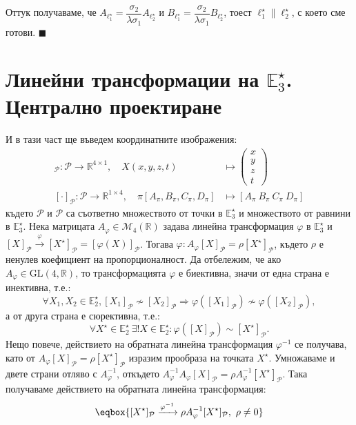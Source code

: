 \documentclass[12pt]{article}
\begin{document}
Оттук получаваме, че $A_{\ell_1^\star}=\dfrac{\sigma_2}{\lambda \sigma_1}A_{\ell_2^\star}$ и $B_{\ell_1^\star}=\dfrac{\sigma_2}{\lambda \sigma_1}B_{\ell_2^\star}$, тоест $\ell_1^\star\parallel \ell_2^\star$, с което сме готови. $\blacksquare$
\Large{\section{ Линейни трансформации на $\mathbb{E}_3^\star$. Централно проектиране}}
И в тази част ще въведем координатните изображения: \begin{align*}
[\cdot]_{\mathcal P} : \mathcal P \to \mathbb{R}^{4\times 1},\quad 
X(x,y,z,t) &\mapsto \begin{pmatrix} x \\ y \\ z \\ t \end{pmatrix} \\
[\cdot]_{\mathscr P} : \mathscr P \to \mathbb{R}^{1\times 4},\quad 
\pi[A_\pi,B_\pi,C_\pi,D_\pi] &\mapsto [A_\pi\ B_\pi\ C_\pi\ D_\pi]
\end{align*}
където $\mathcal P$ и $\mathscr P$ са съответно множеството от точки в $\mathbb{E}_3^\star$ и множеството от равнини в $\mathbb{E}_3^\star$.
Нека матрицата $A_{\varphi}\in \mathcal{M}_4(\mathbb{R})$ задава линейна трансформация $\varphi$ в $\mathbb{E}_3^\star$ и $[X]_{\mathcal P}\xrightarrow{\varphi}[X^\star]_{\mathcal P}=[\varphi(X)]_{\mathcal P}$. Тогава $\varphi: A_{\varphi}[X]_{\mathcal P}=\rho [X^\star]_{\mathcal P}$, където $\rho$ е ненулев коефициент на пропорционалност. Да отбележим, че ако $A_{\varphi}\in\mathrm{GL}(4,\mathbb{R})$, то трансформацията $\varphi$ е биективна, значи от една страна е инективна, т.е.: $$\forall X_1,X_2\in\mathbb{E}_2^\star, [X_1]_{\mathcal P}\not\sim [X_2]_{\mathcal P}\Rightarrow\varphi([X_1]_{\mathcal P})\not\sim\varphi([X_2]_{\mathcal P}),$$ а от друга страна е сюрективна, т.е.: $$\forall X^\star\in\mathbb{E}_2^\star\ \exists !X\in\mathbb{E}_2^\star:\varphi([X]_{\mathcal P})\sim [X^\star]_{\mathcal P}.$$ Нещо повече, действието на обратната линейна трансформация $\varphi^{-1}$ се получава, като от $A_{\varphi}[X]_{\mathcal P}=\rho [X^\star]_{\mathcal P}$ изразим прообраза на точката $X^\star$. Умножаваме и двете страни отляво с $A_{\varphi}^{-1}$, откъдето $A_{\varphi}^{-1}A_{\varphi}[X]_{\mathcal P}=\rho A_{\varphi}^{-1}[X^\star]_{\mathcal P}$. Така получаваме действието на обратната линейна трансформация: $$\eqbox{[X^\star]_{\mathcal P}\xrightarrow{\varphi^{-1}}\rho A_{\varphi}^{-1}[X^\star]_{\mathcal P},\ \rho\neq 0}$$
\end{document}
